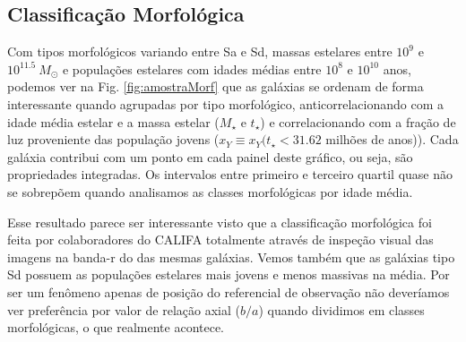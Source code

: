 \subsection{Classificação Morfológica}
\label{sec:amostra:morf}

Com tipos morfológicos variando entre Sa e Sd, massas estelares entre $10^9$ e $10^{11.5}\ M_\odot$
e populações estelares com idades médias entre $10^8$ e $10^{10}$ anos, podemos ver na Fig.
\ref{fig:amostraMorf} que as galáxias se ordenam de forma interessante quando agrupadas por tipo
morfológico, anticorrelacionando com a idade média estelar e a massa estelar ($M_\star$ e $t_\star$)
e correlacionando com a fração de luz proveniente das população jovens ($x_Y \equiv x_Y(t_\star <
31.62$ milhões de anos)). Cada galáxia contribui com um ponto em cada painel deste gráfico, ou seja,
são propriedades integradas. Os intervalos entre primeiro e terceiro quartil quase não se sobrepõem
quando analisamos as classes morfológicas por idade média.

Esse resultado parece ser interessante visto que a classificação morfológica foi feita por
colaboradores do CALIFA totalmente através de inspeção visual das imagens na banda-r do \SDSS das
mesmas galáxias. Vemos também que as galáxias tipo Sd possuem as populações estelares mais jovens e
menos massivas na média. Por ser um fenômeno apenas de posição do referencial de observação não
deveríamos ver preferência por valor de relação axial ($b/a$) quando dividimos em classes
morfológicas, o que realmente acontece.

